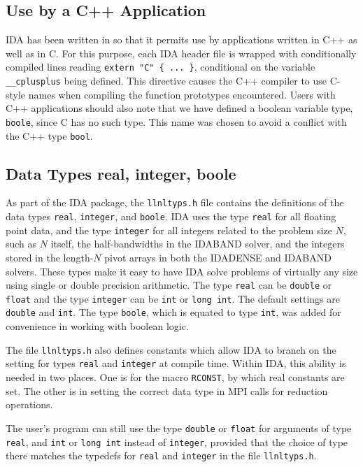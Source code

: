 \documentclass[11pt]{article}
\begin{document}
  
\subsection{Use by a C++ Application}

IDA has been written in so that it permits use by
applications written in C++ as well as in C.  For this purpose, each
IDA header file is wrapped with conditionally compiled lines reading
{\tt extern "C" \{ ... \}}, conditional on the variable 
{\tt \_\_cplusplus} being defined.  This directive causes the C++
compiler to use C-style names when compiling the function prototypes
encountered.  Users with C++ applications should also
note that we have defined a boolean variable type, 
{\tt boole}, since C has no such type.  This name was chosen to
avoid a conflict with the C++ type {\tt bool}.


\subsection{Data Types real, integer, boole}

As part of the IDA package, the {\tt llnltyps.h} file contains the
definitions of the data types {\tt real}, {\tt integer}, and {\tt boole}.
IDA uses the type {\tt real} for all floating point data, and the type
{\tt integer} for all integers related to the problem size $N$, such
as $N$ itself, the half-bandwidths in the IDABAND solver, and the
integers stored in the length-$N$ pivot arrays in both the IDADENSE
and IDABAND solvers.  These types make it easy to have IDA solve
problems of virtually any size using single or double precision
arithmetic.  The type {\tt real} can be {\tt double} or {\tt float}
and the type {\tt integer} can be {\tt int} or {\tt long int}. The
default settings are {\tt double} and {\tt int}.  The type 
{\tt boole}, which is equated to type {\tt int}, was added for
convenience in working with boolean logic.

The file {\tt llnltyps.h} also defines constants which allow IDA to
branch on the setting for types {\tt real} and {\tt integer} at
compile time.  Within IDA, this ability is needed in two places.  One
is for the macro {\tt RCONST}, by which real constants are set.  The
other is in setting the correct data type in MPI calls for reduction
operations.

The user's program can still use the type {\tt double} or {\tt float}
for arguments of type {\tt real}, and {\tt int} or {\tt long int}
instead of {\tt integer}, provided that the choice of type there
matches the typedefs for {\tt real} and {\tt integer} in the file 
{\tt llnltyps.h}.
\end{document}
